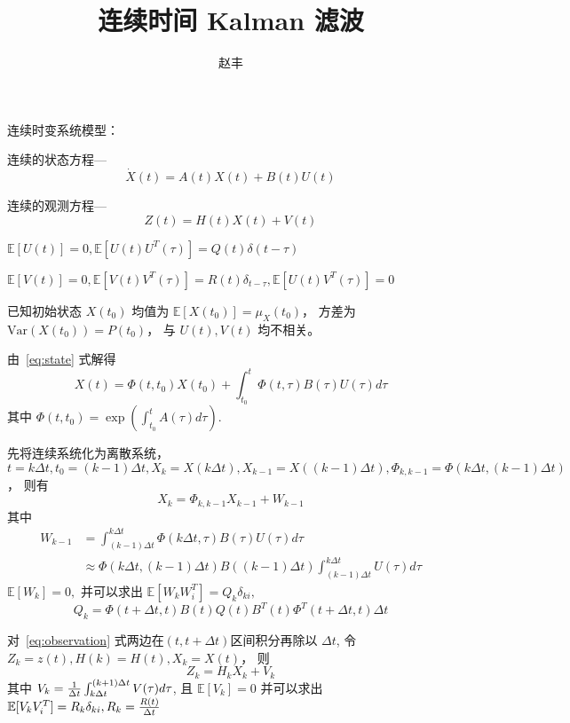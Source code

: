 \documentclass{ctexart}
\def\E{\mathbb{E}}
\def\Var{\textrm{Var}}
\begin{document}
\title{连续时间 Kalman 滤波}
\author{赵丰}
\maketitle
连续时变系统模型：

连续的状态方程---
\begin{equation}\label{eq:state}
\dot X(t) = A(t) X(t) + B(t) U(t)
\end{equation}

连续的观测方程---
\begin{equation}\label{eq:observation}
Z(t) = H(t) X(t) + V(t)
\end{equation}

$ \E[U(t)] = 0, \E[U(t) U^T(\tau)] = Q(t) \delta(t-\tau)$

$ \E[V(t)] = 0, \E[V(t) V^T(\tau)] = R(t) \delta_{t-\tau}, \E[U(t) V^T(\tau)] = 0$

已知初始状态 $X(t_0)$ 均值为 $\E[X(t_0)] = \mu_X(t_0)$， 方差为 $\Var(X(t_0)) = P(t_0)$， 与 $U(t), V(t)$ 均不相关。

由~\eqref{eq:state} 式解得
$$
X(t) = \Phi(t, t_0) X(t_0) + \int_{t_0}^t \Phi(t, \tau) B(\tau) U(\tau) d\tau
$$
其中 $\Phi(t, t_0) = \exp( \int_{t_0}^{t} A(\tau) d\tau)$.

先将连续系统化为离散系统， $ t = k \Delta t, t_0 = (k-1)\Delta t, 
X_k = X(k\Delta t), X_{k-1} = X((k-1)\Delta t), \Phi_{k, k-1} = \Phi(k \Delta t, (k-1) \Delta t) $，
则有
$$
X_k = \Phi_{k, k-1} X_{k-1} + 
W_{k-1}
$$
其中 
\begin{align*}
W_{k-1} & = \int_{(k-1) \Delta t}^{k \Delta t} \Phi(k\Delta t, \tau) B(\tau) U(\tau) d\tau \\
& \approx \Phi(k\Delta t, (k-1)\Delta t) B((k-1)\Delta t) \int_{(k-1)\Delta t}^{k \Delta t} U(\tau) d\tau
\end{align*}
$\E[W_k] = 0,$
并可以求出 
$ \E[W_k W_i^T] = Q_k \delta_{ki}, $
\begin{equation}\label{eq:Q_k}
Q_k = \Phi(t+\Delta t, t) B(t) Q(t) B^T(t) \Phi^T(t+\Delta t, t)\Delta t
\end{equation}

对~\eqref{eq:observation} 式两边在$(t, t+\Delta t)$区间积分再除以 $\Delta t$, 令 $Z_k = z(t), H(k) = H(t), X_k = X(t)$，
则 
$$
Z_k = H_k X_k + V_k
$$
其中 $V_k = {1 \over \Delta t} \int_{k\Delta t}^{(k+1) \Delta t} V(\tau) d\tau $, 且 $\E[V_k] = 0 $
并可以求出
$ \E[V_k V_i^T] = R_k \delta_{ki}, R_k = { R(t) \over \Delta t} $
\end{document}
